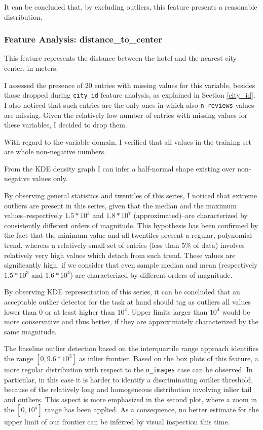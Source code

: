 \documentclass[preprint,12pt,3p]{elsarticle}
\begin{document}
It can be concluded that, by excluding outliers, this feature presents a reasonable distribution.

\subsubsection{Feature Analysis: distance\_to\_center}
\label{distance_to_center}
This feature represents the distance between the hotel and the nearest city center, in meters.

I assessed the presence of $20$ entries with missing values for this variable, besides those dropped during \verb|city_id| feature analysis, as explained in Section \ref{city_id}. I also noticed that such entries are the only ones in which also \verb|n_reviews| values are missing. Given the relatively low number of entries with missing values for these variables, I decided to drop them.

With regard to the variable domain, I verified that all values in the training set are whole non-negative numbers.

From the KDE density graph I can infer a half-normal shape existing over non-negative values only.

By observing general statistics and twentiles of this series, I noticed that extreme outliers are present in this series, given that the median and the maximum values--respectively $1.5*10^3$ and $1.8*10^7$ (approximated)--are characterized by consistently different orders of magnitude. This hypothesis has been confirmed by the fact that the minimum value and all twentiles present a regular, polynomial trend, whereas a relatively small set of entries (less than $5\%$ of data) involves relatively very high values which detach from such trend. These values are significantly high, if we consider that even sample median and mean (respectively $1.5*10^3$ and $1.6*10^4$) are characterized by different orders of magnitude.

By observing KDE representation of this series, it can be concluded that an acceptable outlier detector for the task at hand should tag as outliers all values lower than $0$ or at least higher than $10^4$. Upper limits larger than $10^4$ would be more conservative and thus better, if they are approximately characterized by the same magnitude.

The baseline outlier detection based on the interquartile range approach identifies the range $[0,9.6*10^3]$ as inlier frontier.
Based on the box plots of this feature, a more regular distribution with respect to the \verb|n_images| case can be observed. In particular, in this case it is harder to identify a discriminating outlier threshold, because of the relatively long and homogeneous distribution involving inlier tail and outliers. This aspect is more emphasized in the second plot, where a zoom in the $[0,10^5]$ range has been applied. As a consequence, no better estimate for the upper limit of our frontier can be inferred by visual inspection this time.
\end{document}
